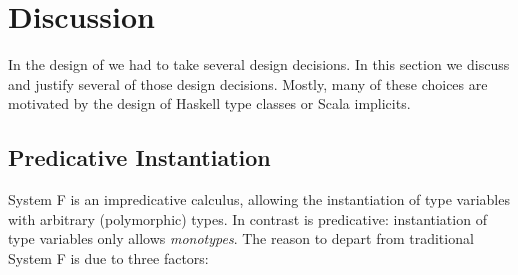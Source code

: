 \section{Discussion}

In the design of \name we had to take several design decisions. In
this section we discuss and justify several of those design decisions.
Mostly, many of these choices are motivated by the design of Haskell 
type classes or Scala implicits.



\subsection{Predicative Instantiation}

System F is an impredicative calculus, allowing the instantiation of
type variables with arbitrary (polymorphic) types. In contrast \name 
is predicative: instantiation of type
variables only allows \emph{monotypes}. The reason to depart from
traditional System F is due to three factors:

